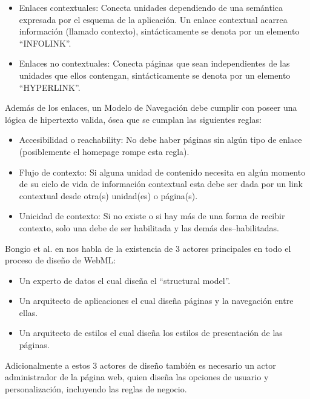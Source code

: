 \documentclass[oneside,12pt,a4paper]{memoir}%
\begin{document}
\begin{itemize}
\begin{itemize}
		  \begin{itemize}
		    \item Enlaces contextuales: Conecta unidades dependiendo de una sem\'antica
		    expresada por el esquema de la aplicaci\'on. Un enlace contextual acarrea
		    informaci\'on (llamado contexto), sint\'acticamente se denota por un elemento
		    ``INFOLINK''.
		    \item Enlaces no contextuales: Conecta p\'aginas que sean independientes
		    de las unidades que ellos contengan, sint\'acticamente se denota por un elemento
		    ``HYPERLINK''.
		  \end{itemize}  
		  
		\end{itemize}
		
		Adem\'as de los enlaces, un Modelo de Navegaci\'on debe
		cumplir con poseer una l\'ogica de hipertexto valida, \'osea que se cumplan
		las siguientes reglas:
		 
		\begin{itemize}
		  \item Accesibilidad o reachability: No debe haber p\'aginas sin alg\'un tipo
		  de enlace (posiblemente el homepage rompe esta regla).
		  \item Flujo de contexto: Si alguna unidad de contenido necesita en alg\'un
		  momento de su ciclo de vida de informaci\'on contextual esta debe ser dada por
		  un link contextual desde otra(s) unidad(es) o p\'agina(s).
		  \item Unicidad de contexto: Si no existe o si hay m\'as de una forma de
		  recibir contexto,  solo una debe de ser habilitada y las dem\'as
		  des--habilitadas.
		\end{itemize}
		
		Bongio et al. en \cite{Ceri2000} nos habla de la existencia de $3$ actores
		principales en todo el proceso de dise\~no de \ac{WebML}:
		
		\begin{itemize}
		  \item Un experto de datos el cual dise\~na el ``structural model''.
		  \item Un arquitecto de aplicaciones el cual dise\~na p\'aginas y la navegaci\'on
		  entre ellas.
		  \item Un arquitecto de estilos el cual dise\~na los estilos de presentaci\'on de
		  las p\'aginas.
		\end{itemize}
		
		Adicionalmente a estos $3$ actores de dise\~no tambi\'en es necesario un actor
		administrador de la p\'agina web, quien dise\~na las opciones de usuario y
		personalizaci\'on, incluyendo las reglas de negocio.
		

\end{itemize}
\end{document}
